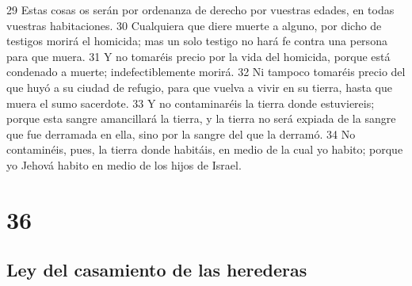 29 Estas cosas os serán por ordenanza de derecho por vuestras edades, en todas vuestras habitaciones.
30 Cualquiera que diere muerte a alguno, por dicho de testigos morirá el homicida; mas un solo testigo no hará fe contra una persona para que muera.
31 Y no tomaréis precio por la vida del homicida, porque está condenado a muerte; indefectiblemente morirá.
32 Ni tampoco tomaréis precio del que huyó a su ciudad de refugio, para que vuelva a vivir en su tierra, hasta que muera el sumo sacerdote.
33 Y no contaminaréis la tierra donde estuviereis; porque esta sangre amancillará la tierra, y la tierra no será expiada de la sangre que fue derramada en ella, sino por la sangre del que la derramó.
34 No contaminéis, pues, la tierra donde habitáis, en medio de la cual yo habito; porque yo Jehová habito en medio de los hijos de Israel.

\chapter{36}

\section*{Ley del casamiento de las herederas}

